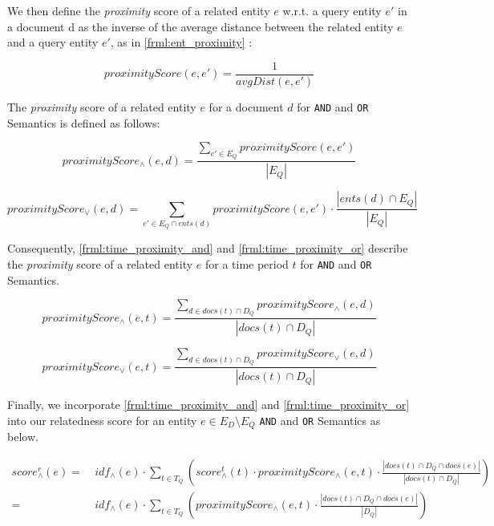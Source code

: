 \documentclass[10pt,a4paper]{article} %
\begin{document}
    \noindent We then define the {\em proximity} score of a related entity $e$ w.r.t. a query entity $e'$ in a document d as the inverse of the average distance between the related entity $e$ and a query entity $e'$, as in \ref{frml:ent_proximity} :
    
    \begin{equation}
    \label{frml:ent_proximity}
    proximityScore(e, e') = \frac{1}{avgDist(e,e')}
    \end{equation}

    \noindent The {\em proximity} score of a related entity $e$ for a document $d$ for {\tt AND} and {\tt OR} Semantics is defined as follows:
    
    \begin{equation}
    \label{frml:doc_proximity_and}
    proximityScore_{\wedge}(e,d) = \frac{\sum_{e' \in E_Q}{proximityScore(e,e')}}{|E_Q|}
    \end{equation}

    \begin{equation}
    \label{frml:doc_proximity_or}
    proximityScore_{\vee}(e,d) = {\sum_{e' \in E_Q \cap ents(d)}{proximityScore(e,e')}} \cdot \frac{|ents(d) \cap E_Q|}{|E_Q|}
    \end{equation}

    \noindent Consequently, \ref{frml:time_proximity_and} and \ref{frml:time_proximity_or} describe the {\em proximity} 
    score of a related entity $e$ for a time period $t$ for {\tt AND} and {\tt OR} Semantics. 
    
    \begin{equation}
    \label{frml:time_proximity_and}
    proximityScore_{\wedge}(e,t) = \frac{\sum_{d \in docs(t) \cap D_Q}{proximityScore_{\wedge}(e,d)}}{|docs(t) \cap D_Q|}
    \end{equation}

    \begin{equation}
    \label{frml:time_proximity_or}
    proximityScore_{\vee}(e,t) = \frac{\sum_{d \in docs(t) \cap D_Q}{proximityScore_{\vee}(e,d)}}{|docs(t) \cap D_Q|}
    \end{equation}
    
    \noindent Finally, we incorporate \ref{frml:time_proximity_and} and \ref{frml:time_proximity_or} into our relatedness score for an entity $e \in E_D \setminus E_Q$ {\tt AND} and {\tt OR} Semantics as below. 
    
    \begin{equation}
    \begin{split}
     score^{r}_\wedge(e) = & ~ idf_\wedge(e) \cdot \sum_{t \in T_Q}{(score^{t}_\wedge(t) \cdot proximityScore_{\wedge}(e,t) \cdot \frac{|docs(t) \cap D_Q \cap docs(e)|}{|docs(t) \cap D_Q|})}\\
    = & ~ idf_\wedge(e) \cdot \sum_{t \in T_Q}{(proximityScore_{\wedge}(e,t) \cdot \frac{|docs(t) \cap D_Q \cap docs(e)|}{|D_Q|})}
    \end{split}
    \end{equation}
\end{document}
